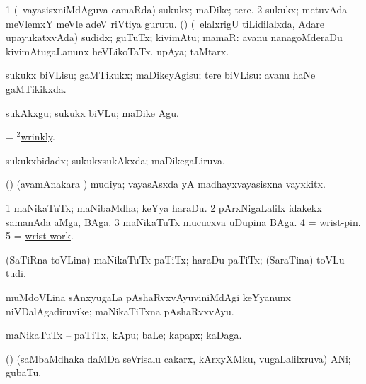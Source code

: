 \bentry
{} 
\gl{\nA}
\expl{}
\bmng
\bnum
\num{1} (\sA\ vayasisxniMdAguva camaRda) sukukx; maDike; tere. 
\num{2} sukukx; metuvAda meVlemxY meVle adeV riVtiya gurutu. 
 (\AmA) 
\banum
{} (\sA\ elalxrigU tiLidilalxda, Adare upayukatxvAda) sudidx; guTuTx; kivimAtu; mamaR:  avanu nanagoMderaDu kivimAtugaLanunx heVLikoTaTx. 
 upAya; taMtarx. 
\eanum
\numie
\enum
\emng
\eentry

\bentry
{} 
\gl{\sakirx}
\expl{}
\bmng
sukukx biVLisu; gaMTikukx; maDikeyAgisu; tere biVLisu:  avanu haNe gaMTikikxda. 
\emng

\noindent
\gl{\akirx}
\expl{}
\bmng
sukAkxgu; sukukx biVLu; maDike Agu. 
\emng
\eentry

\bentry
{} 
\gl{\nA}
\expl{}
\bmng
= \hyperlink{wrinkly(2)}{$^2$wrinkly}. 
\emng
\eentry

\bentry 
{} 
\gl{\gu}
\bmng
sukukxbidadx; sukukxsukAkxda; maDikegaLiruva. 
\emng
\eentry

\bentry 
{} 
\gl{\nA}
\bmng
(\ashi) (avamAnakara \parx) mudiya; vayasAsxda yA madhayxvayasisxna vayxkitx. 
\emng
\eentry

\bentry
{} 
\gl{\nA}
\expl{}
\bmng
\bnum
\num{1} maNikaTuTx; maNibaMdha; keYya haraDu. 
\num{2} pArxNigaLalilx idakekx samanAda aMga, BAga. 
\num{3} maNikaTuTx mucucxva uDupina BAga. 
\num{4} = \hyperlink{wrist-pin}{wrist-pin}. 
\num{5} = \hyperlink{wrist-work}{wrist-work}. 
\enum
\emng
\eentry

\bentry
{} 
\gl{\nA}
\expl{}
\bmng
(SaTiRna toVLina) maNikaTuTx paTiTx; haraDu paTiTx; (SaraTina) toVLu tudi. 
\emng
\eentry

\bentry
{} 
\gl{\nA}
\expl{}
\bmng
muMdoVLina sAnxyugaLa pAshaRvxvAyuviniMdAgi keYyanunx niVDalAgadiruvike; maNikaTiTxna pAshaRvxvAyu. 
\emng
\eentry

\bentry
{} 
\gl{\nA}
\expl{}
\bmng
maNikaTuTx -- paTiTx, kApu; baLe; kapapx; kaDaga. 
\emng
\eentry

\bentry
{} 
\gl{\nA}
\expl{}
\bmng
(\yaMshA) (saMbaMdhaka daMDa seVrisalu cakarx, kArxyXMku, \mo vugaLalilxruva) ANi; gubaTu. 
\emng
\eentry

